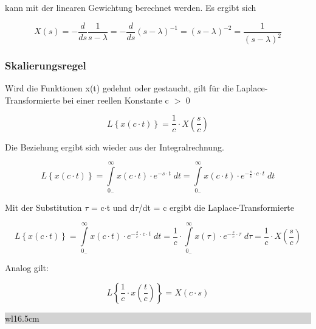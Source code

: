 \noindent kann mit der linearen Gewichtung berechnet werden. Es ergibt sich 

\begin{equation}\label{eq:fourfourtynine}
X\left(s\right)=-\frac{d}{ds} \frac{1}{s-\lambda } =-\frac{d}{ds} \left(s-\lambda \right)^{-1} =\left(s-\lambda \right)^{-2} =\frac{1}{\left(s-\lambda \right)^{2} } 
\end{equation}

\subsubsection{Skalierungsregel}

\noindent Wird die Funktionen x(t) gedehnt oder gestaucht, gilt für die Laplace-Transformierte bei einer reellen Konstante c $\mathrm{>}$ 0

\begin{equation}\label{eq:fourfifty}
L\left\{x\left(c\cdot t\right)\right\}=\frac{1}{c} \cdot X\left(\frac{s}{c} \right)
\end{equation}

\noindent Die Beziehung ergibt sich wieder aus der Integralrechnung.

\begin{equation}\label{eq:fourfiftyone}
L\left\{x\left(c\cdot t\right)\right\}=\int\limits _{0_{-} }^{\infty }x\left(c\cdot t\right)\cdot e^{-s\cdot t} \;  dt=\int\limits _{0_{-} }^{\infty }x\left(c\cdot t\right)\cdot e^{-\frac{s}{c} \cdot c\cdot t} \;  dt
\end{equation}

\noindent Mit der Substitution $\tau$ = c$\cdot$t und d$\tau$/dt = c ergibt die Laplace-Transformierte 

\begin{equation}\label{eq:fourfiftytwo}
L\left\{x\left(c\cdot t\right)\right\}=\int\limits _{0_{-} }^{\infty }x\left(c\cdot t\right)\cdot e^{-\frac{s}{c} \cdot c\cdot t} \; dt=\frac{1}{c} \cdot \int\limits _{0_{-} }^{\infty }x\left(\tau \right)\cdot e^{-\frac{s}{c} \cdot \tau } \; d\tau =\frac{1}{c} \cdot X\left(\frac{s}{c} \right)
\end{equation}

\noindent Analog gilt:

\begin{equation}\label{eq:fourfiftythree}
L\left\{\frac{1}{c} \cdot x\left(\frac{t}{c} \right)\right\}=X\left(c\cdot s\right)
\end{equation}\bigskip

\noindent
\colorbox{lightgray}{%
%
\renewcommand\arraystretch{0.6}%
\begin{tabular}{ wl{16.5cm} }
{\selectfont{Beispiel: Skalierungsregel der Laplace-Transformation}}
\end{tabular}%
}\bigskip

